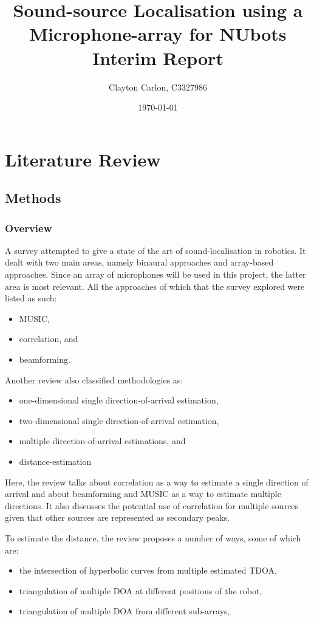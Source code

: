 \documentclass{report}
\title{
	Sound-source Localisation using a Microphone-array for NUbots\\
	Interim Report
}
\author{Clayton Carlon, C3327986}
\date{\today}
\begin{document}
\maketitle

\chapter{Literature Review}

\section{Methods}

\subsection{Overview}

A survey \cite{Argentieri2015} attempted to give a state of the art of sound-localisation in robotics. It dealt with two main areas, namely binaural approaches and array-based approaches. Since an array of microphones will be used in this project, the latter area is most relevant. All the approaches of which that the survey explored were listed as such:
\begin{itemize}
	\item MUSIC,
	\item correlation, and
	\item beamforming.
\end{itemize}

Another review \cite{RASCON2017184} also classified methodologies as:
\begin{itemize}
	\item one-dimensional single direction-of-arrival estimation,
	\item two-dimensional single direction-of-arrival estimation,
	\item multiple direction-of-arrival estimations, and
	\item distance-estimation
\end{itemize}
Here, the review talks about correlation as a way to estimate a single direction of arrival and about beamforming and MUSIC as a way to estimate multiple directions. It also discusses the potential use of correlation for multiple sources given that other sources are represented as secondary peaks. 

To estimate the distance, the review proposes a number of ways, some of which are:
\begin{itemize}
	\item the intersection of hyperbolic curves from multiple estimated TDOA,
	\item triangulation of multiple DOA at different positions of the robot,
	\item triangulation of multiple DOA from different sub-arrays,
\end{itemize} 
\end{document}
